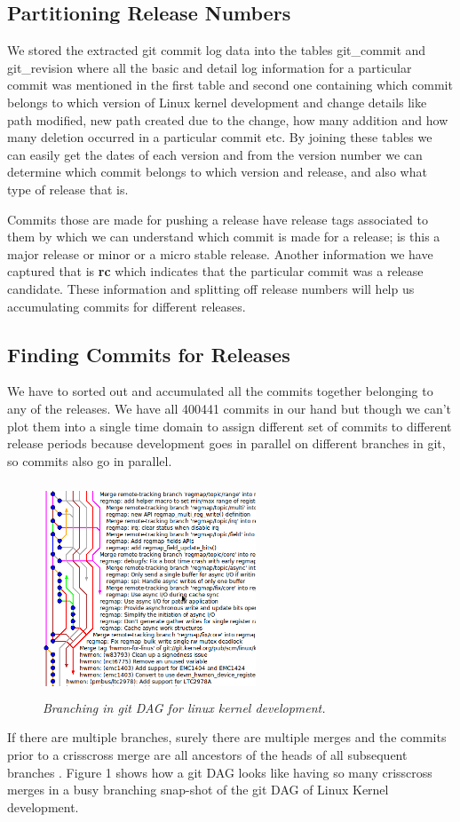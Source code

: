 \documentclass{acm_proc_article-sp}
\begin{document}
 \subsection{Partitioning Release Numbers}
We stored the extracted git commit log data into the tables git\_commit and git\_revision where all the basic and detail log information for a particular commit was mentioned in the first table and second one containing which commit belongs to which version of Linux kernel development and change details like path modified, new path created due to the change, how many addition and how many deletion occurred in a particular commit etc. By joining these tables we can easily get the dates of each version and from the version number we can determine which commit belongs to which version and release, and also what type of release that is.

Commits those are made for pushing a release have release tags associated to them by which we can understand which commit is made for a release; is this a major release or minor or a micro stable release. Another information we have captured that is \textbf{rc} which indicates that the particular commit was a release candidate. These information and splitting off release numbers will help us accumulating commits for different releases.

\subsection{Finding Commits for Releases}
We have to sorted out and accumulated all the commits together belonging to any of the releases. We have all 400441 commits in our hand but though we can't plot them into a single time domain to assign different set of commits to different release periods because development goes in parallel on different branches in git, so commits also go in parallel.
\begin{figure}
\begin{center}
\includegraphics[height=2.5in,width=2.5in]{gitdag.png}
\caption{\small \sl Branching in git DAG for linux kernel development.}
\end{center}
\end{figure}
If there are multiple branches, surely there are multiple merges and the commits prior to a crisscross merge are all ancestors of the heads of all subsequent branches \cite{bird_git}. Figure 1 shows how a git DAG looks like having so many crisscross merges in a busy branching snap-shot of the git DAG of Linux Kernel development.
\end{document}
